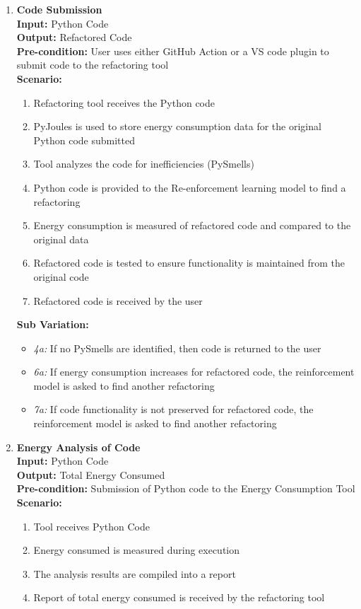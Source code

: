 \documentclass[12pt]{article}
\begin{document}
\begin{enumerate}[label={\bf BUC \arabic*:}, wide=0pt, font=\itshape]
  \item {\bf Code Submission} \\[2mm]
    \textbf{Input:} Python Code \\
    \textbf{Output:} Refactored Code \\
    \textbf{Pre-condition:} User uses either GitHub Action or a VS code plugin to submit code to the refactoring tool \\[2mm]  
    \textbf{Scenario:}
      \begin{enumerate}[label=\arabic*.]
        \item Refactoring tool receives the Python code
        \item PyJoules is used to store energy consumption data for the original Python code submitted
        \item Tool analyzes the code for inefficiencies (PySmells)
        \item Python code is provided to the Re-enforcement learning model to find a refactoring
        \item Energy consumption is measured of refactored code and compared to the original data
        \item Refactored code is tested to ensure functionality is maintained from the original code
        \item Refactored code is received by the user
      \end{enumerate}
    \textbf{Sub Variation: }
      \begin{itemize}
        \item \textit{4a:} If no PySmells are identified, then code is returned to the user
        \item \textit{6a:} If energy consumption increases for refactored code, the reinforcement model is asked to find another refactoring
        \item \textit{7a:} If code functionality is not preserved for refactored code, the reinforcement model is asked to find another refactoring
      \end{itemize}

  \item {\bf Energy Analysis of Code}\\[2mm]
    \textbf{Input:} Python Code \\
    \textbf{Output:} Total Energy Consumed \\
    \textbf{Pre-condition:} Submission of Python code to the Energy Consumption Tool \\[2mm]
    \textbf{Scenario: } 
    \begin{enumerate}[label=\arabic*.]
        \item Tool receives Python Code
        \item Energy consumed is measured during execution
        \item The analysis results are compiled into a report
        \item Report of total energy consumed is received by the refactoring tool
    \end{enumerate}
  

\end{enumerate}
\end{document}
